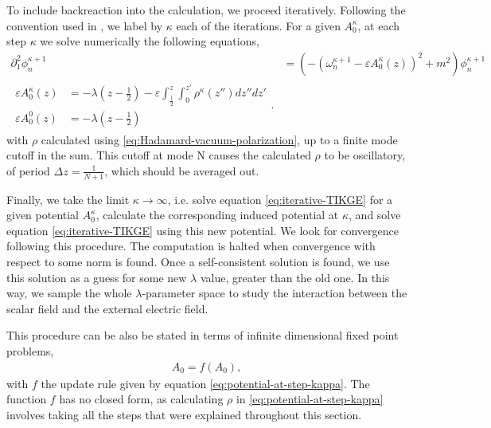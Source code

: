 To include backreaction into the calculation, we proceed iteratively.
Following the convention used in \cite{Ambjorn1983}, we label by $\kappa$ each of the iterations. For a given $A_0^{\kappa}$, at each step $\kappa$ we solve numerically the following equations,
\begin{align}
	\partial_1^2 \phi^{\kappa+1}_n &=
	\left( - (\omega^{\kappa+1}_n - \varepsilon A^{\kappa}_0(z))^2 + m^2 \right) \phi^{\kappa+1}_n
	\label{eq:iterative-TIKGE}\\
	\begin{split}
		\varepsilon A_0^{\kappa}(z) &= -\lambda\left( z-\frac{1}{2} \right)  - \varepsilon\int_{\frac{1}{2}}^{z} \int_{0}^{z'} \rho^{\kappa}(z'')  dz'' dz'\\
		\varepsilon A_0^{0}(z) &= -\lambda\left( z-\frac{1}{2}\right) 
	\end{split}
	\label{eq:potential-at-step-kappa}
.
\end{align}
with $\rho$ calculated using \eqref{eq:Hadamard-vacuum-polarization}, up to a finite mode cutoff in the sum. This cutoff at mode N causes the calculated $\rho$ to be oscillatory, of period $\Delta z = \frac{1}{N+1}$, which should be averaged out.

Finally, we take the limit $\kappa \to \infty$, i.e. solve equation \eqref{eq:iterative-TIKGE} for a given potential $A_0^{\kappa}$, calculate the corresponding induced potential at $\kappa$, and solve equation \eqref{eq:iterative-TIKGE} using this new potential. We look for convergence following this procedure. The computation is halted when convergence with respect to some norm is found. Once a self-consistent solution is found, we use this solution as a guess for some new $\lambda$ value, greater than the old one. In this way, we sample the whole $\lambda$-parameter space to study the interaction between the scalar field and the external electric field. 

This procedure can be also be stated in terms of infinite dimensional fixed point problems,
\begin{align}
	A_0 = f(A_0),
\end{align}
with $f$ the update rule given by equation \eqref{eq:potential-at-step-kappa}. The function $f$ has no closed form, as calculating $\rho$ in \eqref{eq:potential-at-step-kappa} involves taking all the steps that were explained throughout this section. 

